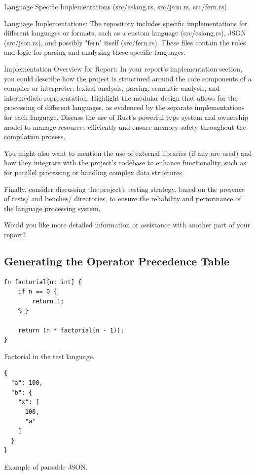 Language Specific Implementations (src/eslang.rs, src/json.rs, src/fern.rs)

    Language Implementations: The repository includes specific implementations
for different languages or formats, such as a custom language (src/eslang.rs),
JSON (src/json.rs), and possibly "fern" itself (src/fern.rs). These files
contain the rules and logic for parsing and analyzing these specific languages.

Implementation Overview for Report:
In your report's implementation section, you could describe how the project
is structured around the core components of a compiler or interpreter: lexical
analysis, parsing, semantic analysis, and intermediate representation. Highlight
the modular design that allows for the processing of different languages, as
evidenced by the separate implementations for each language. Discuss the use of
Rust's powerful type system and ownership model to manage resources efficiently
and ensure memory safety throughout the compilation process.

You might also want to mention the use of external libraries (if any are used)
and how they integrate with the project's codebase to enhance functionality,
such as for parallel processing or handling complex data structures.

Finally, consider discussing the project's testing strategy, based on the
presence of tests/ and benches/ directories, to ensure the reliability and
performance of the language processing system.

Would you like more detailed information or assistance with another part of
your report?


\subsection{Generating the Operator Precedence Table}

\begin{listing}[H]
\begin{verbatim}
fn factorial[n: int] {
    if n == 0 {
        return 1;
    % } 

    return (n * factorial(n - 1));
}
\end{verbatim}
\caption{Factorial in the test language.}
\label{lst:factorial_example}
\end{listing}

\begin{listing}[H]
\begin{verbatim}
{
  "a": 100,
  "b": {
    "x": [
      100,
      "a"
    ]
  }
}
\end{verbatim}
\caption{Example of parsable JSON.}
\hrulefill
\label{lst:json_example}
\end{listing}

